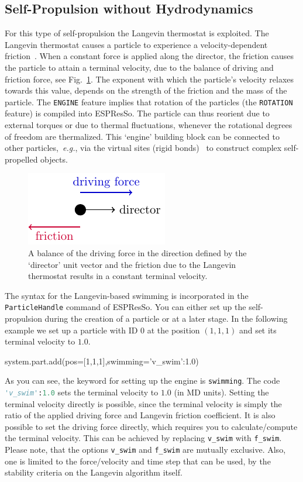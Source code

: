 \documentclass[aip,jcp,reprint,a4paper,onecolumn,amsmath]{revtex4-1}
\newcommand\code{\lstinline}
\newcommand{\es}{\mbox{\textsf{ESPResSo}}\xspace}
\newcommand\codees{\lstinline[language=python]}
\begin{document}
\subsection{\label{sub:langevin}Self-Propulsion without Hydrodynamics}

For this type of self-propulsion the Langevin thermostat is exploited. The Langevin thermostat causes a particle to experience a velocity-dependent friction~\cite{UG}. When a constant force is applied along the director, the friction causes the particle to attain a terminal velocity, due to the balance of driving and friction force, see Fig.~\ref{fig:balance}. The exponent with which the particle's velocity relaxes towards this value, depends on the strength of the friction and the mass of the particle. The \code{ENGINE} feature implies that rotation of the particles (the \code{ROTATION} feature) is compiled into \es{}. The particle can thus reorient due to external torques or due to thermal fluctuations, whenever the rotational degrees of freedom are thermalized. This `engine' building block can be connected to other particles,~\textit{e.g.}, via the virtual sites (rigid bonds)~\cite{UG} to construct complex self-propelled objects.

\begin{figure}[!htb]
\begin{center}
\includegraphics[scale=1.0]{FIGURES/friction}
\end{center}
\caption{\label{fig:balance}A balance of the driving force in the direction defined by the `director' unit vector and the friction due to the Langevin thermostat results in a constant terminal velocity.}
\end{figure}

The syntax for the Langevin-based swimming is incorporated in the \codees{ParticleHandle} command of \es{}. You can either set up the self-propulsion during the creation of a particle or at a later stage. In the following example we set up a particle with ID 0 at the position $(1,1,1)$ and set its terminal velocity to $1.0$.
\begin{espresso}
system.part.add(pos=[1,1,1],swimming={'v_swim':1.0})
\end{espresso}
As you can see, the keyword for setting up the engine is \codees{swimming}. The code \codees{'v_swim':1.0} sets the terminal velocity to $1.0$ (in MD units). Setting the terminal velocity directly is possible, since the terminal velocity is simply the ratio of the applied driving force and Langevin friction coefficient. It is also possible to set the driving force directly, which requires you to calculate/compute the terminal velocity. This can be achieved by replacing \codees{v_swim} with \codees{f_swim}. Please note, that the options \codees{v_swim} and \codees{f_swim} are mutually exclusive. Also, one is limited to the force/velocity and time step that can be used, by the stability criteria on the Langevin algorithm itself.
\end{document}

